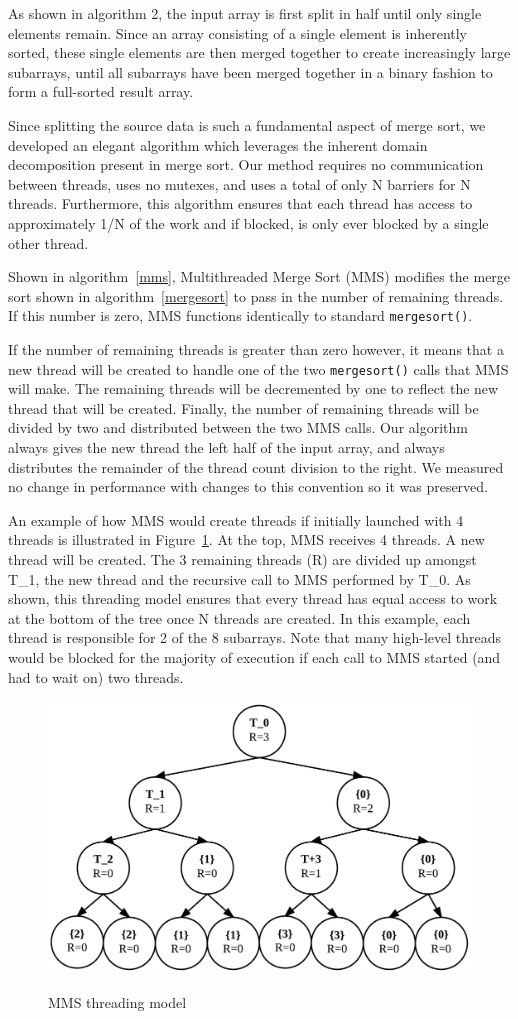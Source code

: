 \documentclass[journal]{IEEEtran}
\begin{document}
As shown in algorithm 2, the input array is first split in half until only single elements remain.  Since an array consisting of a single element is inherently sorted, these single elements are then merged together to create increasingly large subarrays, until all subarrays have been merged together in a binary fashion to form a full-sorted result array.

Since splitting the source data is such a fundamental aspect of merge sort, we developed an elegant algorithm which leverages the inherent domain decomposition present in merge sort.  Our method requires no communication between threads, uses no mutexes, and uses a total of only N barriers for N threads.  Furthermore, this algorithm ensures that each thread has access to approximately 1/N of the work and if blocked, is only ever blocked by a single other thread.  

Shown in algorithm~\ref{mms}, Multithreaded Merge Sort (MMS) modifies the merge sort shown in algorithm~\ref{mergesort} to pass in the number of remaining threads.  If this number is zero, MMS functions identically to standard \texttt{mergesort()}. 

If the number of remaining threads is greater than zero however, it means that a new thread will be created to handle one of the two \texttt{mergesort()} calls that MMS will make.  The remaining threads will be decremented by one to reflect the new thread that will be created.  Finally, the number of remaining threads will be divided by two and distributed between the two MMS calls.  Our algorithm always gives the new thread the left half of the input array, and always distributes the remainder of the thread count division to the right.  We measured no change in performance with changes to this convention so it was preserved.  

An example of how MMS would create threads if initially launched with 4 threads is illustrated in Figure~\ref{mms_thread}.  At the top, MMS receives 4 threads. A new thread will be created.  The 3 remaining threads (R) are divided up amongst T\_1, the new thread and the recursive call to MMS performed by T\_0.  As shown, this threading model ensures that every thread has equal access to work at the bottom of the tree once N threads are created.  In this example, each thread is responsible for 2 of the 8 subarrays.  Note that many high-level threads would be blocked for the majority of execution if each call to MMS started (and had to wait on) two threads.

\begin{figure}[f]
\caption{MMS threading model}
\centering
\includegraphics[width=.5\textwidth]{include/mms.png}
\label{mms_thread}
\end{figure}
\end{document}

